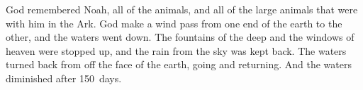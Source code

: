 
\begin{inparaenum}
     God remembered Noah, all of the animals, and all of the large animals that were with him in the Ark. God make a wind pass from one end of the earth to the other, and the waters went down.%
     The fountains of the deep and the windows of heaven were stopped up, and the rain from the sky was kept back.%
     The waters turned back from off the face of the earth, going and returning. And the waters diminished after 150~days.%
\end{inparaenum}
